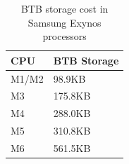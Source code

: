 \begin{table}[t]
  \centering
  \caption{\label{tab:btbcap} BTB storage cost in Samsung Exynos processors}
  \begin{tabular}{ll}\hline
    \textbf{CPU} & \textbf{BTB Storage} \\\hline
    M1/M2 & 98.9KB \\
    M3 & 175.8KB \\
    M4 & 288.0KB \\
    M5 & 310.8KB \\
    M6 & 561.5KB \\\hline
  \end{tabular}
\end{table}






